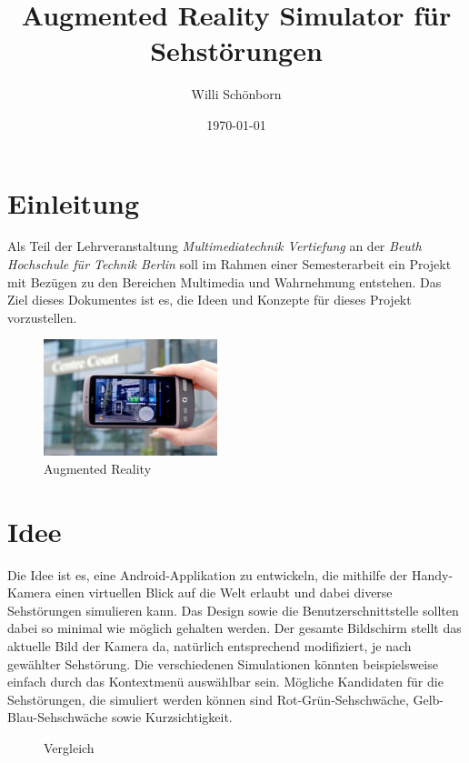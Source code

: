 \documentclass[a4paper]{article}
\title{Augmented Reality Simulator für Sehstörungen}
\author{Willi Schönborn}
\date{\today}
\begin{document}
\maketitle

\section*{Einleitung}
Als Teil der Lehrveranstaltung \textit{Multimediatechnik Vertiefung} an der \textit{Beuth Hochschule für Technik Berlin} soll im Rahmen einer Semesterarbeit ein Projekt mit Bezügen zu den Bereichen Multimedia und Wahrnehmung entstehen. Das Ziel dieses Dokumentes ist es, die Ideen und Konzepte für dieses Projekt vorzustellen.

\begin{figure}[htbp]
\centering
\includegraphics[width=0.45\textwidth]{500x_ibm-seer.jpg}
\caption{Augmented Reality}
\end{figure}

\section*{Idee}

Die Idee ist es, eine Android-Applikation zu entwickeln, die mithilfe der Handy-Kamera einen virtuellen Blick auf die Welt erlaubt und dabei diverse Sehstörungen simulieren kann. Das Design sowie die Benutzerschnittstelle sollten dabei so minimal wie möglich gehalten werden. Der gesamte Bildschirm stellt das aktuelle Bild der Kamera da, natürlich entsprechend modifiziert, je nach gewählter Sehstörung. Die verschiedenen Simulationen könnten beispielsweise einfach durch das Kontextmenü auswählbar sein. Mögliche Kandidaten für die Sehstörungen, die simuliert werden können sind Rot-Grün-Sehschwäche, Gelb-Blau-Sehschwäche sowie Kurzsichtigkeit. 

\begin{figure}[ht]
\centering
{}
\caption{Vergleich}
\end{figure}

\newpage

\nocite{gizmodo}
\nocite{android}
\nocite{wp-rotgruen}
\nocite{vischeck}
\nocite{ichbinfarbenblind}
\nocite{kurzsichtig}
\printbibliography

\listoffigures
\end{document}
